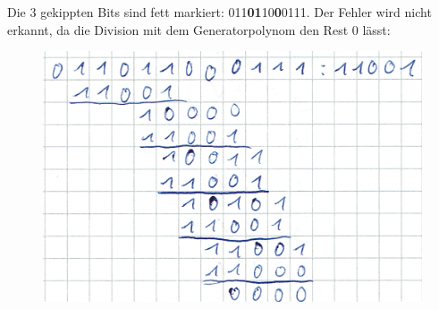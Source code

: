 \documentclass{../exercisesheet}
\begin{document}
\begin{exercise}{4}
	\begin{subexercise} 
	Die 3 gekippten Bits sind fett markiert: 011\textbf{01}10\textbf{0}0111. Der Fehler wird nicht erkannt, da die Division mit dem Generatorpolynom
	den Rest 0 lässt:
	\begin{figure}[h]
 		\centering
		\includegraphics{3_6c.png}
	\end{figure}
	\end{subexercise}
\end{exercise}
\end{document}
